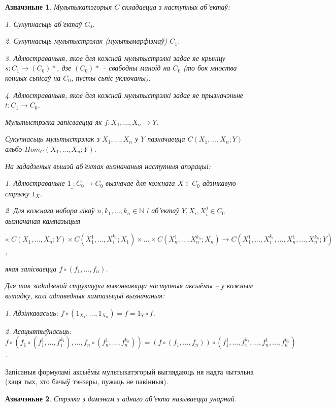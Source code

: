 \documentclass[a4paper,12pt]{book}
\newtheorem{definition}{Азначэньне}[section]
\begin{document}
\begin{definition}
  Мультыкатэгорыя $C$ складаецца з наступных аб'ектаў:

  1. Сукупнасьць аб'ектаў $C_0$.

  2. Сукупнасьць мультыстрэлак (мультымарфізмаў) $C_1$.

  3. Адлюстраваньня, якое для кожнай мультыстрэлкі задае яе крыніцу
  $s: C_1 \rightarrow (C_0)*$, дзе $(C_0)*$ -- свабодны маноід на
  $C_0$ (то бок мноства концых сьпісаў на $C_0$, пусты сьпіс
  уключаны).

  4. Адлюстраваньня, якое для кожнай мультыстрэлкі задае яе
  прызначэньне $t: C_1 \rightarrow C_0$.

  Мультыстрэлка запісваецца як $f: X_1,...,X_n \rightarrow Y$.

  Сукупнасьць мультыстрэлак з $X_1, ..., X_n$ у $Y$ пазначаецца
  $C(X_1, ..., X_n;Y)$ альбо $Hom_C(X_1, ..., X_n;Y)$.

  На зададзеных вышэй аб'ектах вызначаныя наступныя апэрацыі:

  1. Адлюстраваньне $1_\_: C_0 \rightarrow C_0$ вызначае для кожнага
  $X \in C_0$ адзінкавую стрэлку $1_X$.

  2. Для кожнага набора лікаў $n, k_1, ..., k_n \in \mathbb{N}$ і
  аб'ектаў $Y, X_i, X_i^j \in C_0$ вызначаная кампазыцыя

  $\circ: C(X_1, ..., X_n; Y) \times C(X_1^1, ..., X_1^{k_1}; X_1)
  \times ... \times C(X_n^1, ..., X_n^{k_n}; X_n) \rightarrow C(X_1^1,
  ..., X_1^{k_1}, ..., X_n^1, ..., X_n^{k_n}; Y)$,

  якая запісваецца $f \circ (f_1, ..., f_n)$.

  Для так зададзенай структуры выконваюцца наступныя аксыёмы -- у
  кожным выпадку, калі адпаведныя кампазыцыі вызначаныя:

  1. Адзінкавасьць: $f \circ (1_{X_1}, ..., 1_{X_n}) = f = 1_Y \circ
  f$.

  2. Асацыятыўнасьць: $f \circ (f_1 \circ (f_1^1, ..., f_1^{k_1}),
  ..., f_n \circ (f_n^1, ..., f_n^{k_n})) = (f \circ (f_1, ..., f_n))
  \circ (f_1^1, ..., f_1^{k_1}, ..., f_n^1, ..., f_n^{k_n})$.
\end{definition}

Запісаныя формуламі аксыёмы мультыкатэгорый выглядаюць ня надта
чытэльна (хаця тых, хто бачыў тэнзары, пужаць не павінныя).

\begin{definition}
  Стрэлка з дамэнам з аднаго аб'екта называецца унарнай.
\end{definition}
\end{document}
